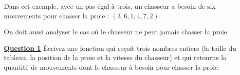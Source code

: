 \documentclass[11pt]{exam}
\begin{document}
\begin{questions}
Dans cet exemple, avec un pas \'egal \`a trois, un chasseur a besoin de six mouvements pour chasser la proie : $(3, 6, 1, 4, 7, 2)$.

On doit aussi analyser le cas o\`u le chasseur ne peut jamais chasser la proie.

\underline{\bf Question 1} \'Ecrivez une fonction qui re\c coit trois nombres entiers (la taille du tableau, la position de la proie et la vitesse du chasseur) et qui retourne la quantit\'e de mouvements dont le chasseur \`a besoin pour chasser la proie.
\end{questions}
\end{document}
